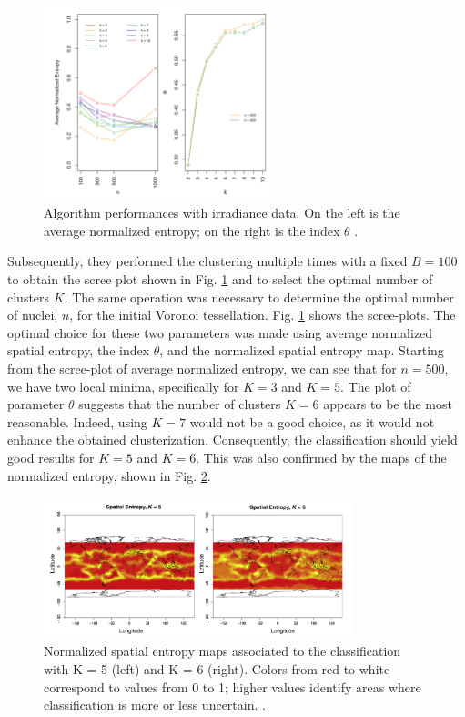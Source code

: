 \begin{figure}
    \centering
    \includegraphics[width=0.6\textwidth]{Images/baggingscreeplot.png}
    \caption[Result on irradiance data.]{Algorithm performances with irradiance data. On the left is the average normalized entropy; on the right is the index $\theta$ \cite{secchi_bagging_2013}.}
    \label{fig:baggingscreeplot}
\end{figure}
Subsequently, they performed the clustering multiple times with a fixed $B=100$ to obtain the scree plot shown in Fig. \ref{fig:baggingscreeplot} and to select the optimal number of clusters $K$. The same operation was necessary to determine the optimal number of nuclei, $n$, for the initial Voronoi tessellation. Fig. \ref{fig:baggingscreeplot} shows the scree-plots. The optimal choice for these two parameters was made using average normalized spatial entropy, the index $\theta$, and the normalized spatial entropy map. Starting from the scree-plot of average normalized entropy, we can see that for $n=500$, we have two local minima, specifically for $K=3$ and $K=5$. The plot of parameter $\theta$ suggests that the number of clusters $K=6$ appears to be the most reasonable. Indeed, using $K=7$ would not be a good choice, as it would not enhance the obtained clusterization. Consequently, the classification should yield good results for $K=5$ and $K=6$. This was also confirmed by the maps of the normalized entropy, shown in Fig. \ref{fig:irrentropy}.
\begin{figure}
    \centering
    \includegraphics[width = 0.8\textwidth]{Images/irrentropy.png}
    \caption[Normalized spatial entropy for irradiance data.]{Normalized spatial entropy maps associated to the classification with K = 5 (left) and K = 6 (right). Colors from red to white correspond to values from 0 to 1; higher values identify areas where classification is more or less uncertain. \cite{secchi_bagging_2013}.}
    \label{fig:irrentropy}
\end{figure}
